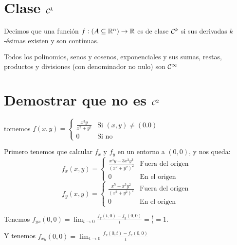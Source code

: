 \documentclass{article}
\begin{document}
\section*{Clase $\mathcal{C}^k$}
Decimos que una función $f : (A \subseteq \mathbb{R}^n) \to \mathbb{R}$ es de clase $\mathcal{C}^k$ si sus derivadas $k$-ésimas existen y son contínuas.

Todos los polinomios, senos y cosenos, exponenciales y sus sumas, restas, productos y divisiones (con denominador no nulo) son $\mathcal{C}^\infty$

\section*{Demostrar que no es $\mathcal{C}^2$}
tomemos $f(x,y) =
\begin{cases}
	\frac{x^3y}{x^2+y^2} & \text{Si $(x,y) \neq (0. 0)$} \\
	0 & \text{Si no}
\end{cases}$

Primero tenemos que calcular $f_x$ y $f_y$ en un entorno a $(0, 0)$, y nos queda:
\[
	f_x (x,y) =
	\begin{cases}
		\frac{x^4y+3x^2y^3}{(x^2+y^2)^2} & \text{Fuera del origen}\\
		0 & \text{En el origen}
	\end{cases}
\]
\[
	f_y (x,y) =
	\begin{cases}
		\frac{x^5-x^3y^2}{(x^2+y^2)^2} & \text{Fuera del origen}\\
		0 & \text{En el origen}
	\end{cases}
\]

Tenemos $f_{yx}(0, 0) = \lim_{t \to 0} \frac{f_y(t, 0) - f_y(0, 0)}{t} = \frac{t}{t} = 1$.

Y tenemos $f_{xy}(0, 0) = \lim_{t \to 0} \frac{f_x(0, t) - f_x(0, 0)}{t}$
\end{document}
